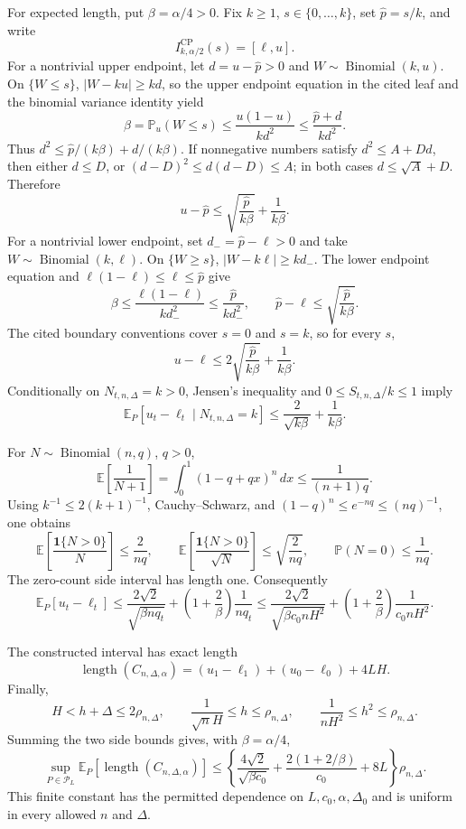 For expected length, put \(\beta=\alpha/4>0\).  Fix \(k\geq1\), \(s\in\{0,\ldots,k\}\), set \(\widehat p=s/k\), and write
\[
 I^{\mathrm{CP}}_{k,\alpha/2}(s)=[\ell,u].
\]
For a nontrivial upper endpoint, let \(d=u-\widehat p>0\) and \(W\sim\operatorname{Binomial}(k,u)\).  On \(\{W\leq s\}\), \(|W-ku|\geq kd\), so the upper endpoint equation in the cited leaf and the binomial variance identity yield
\[
 \beta=\mathbb P_u(W\leq s)
 \leq\frac{u(1-u)}{kd^2}
 \leq\frac{\widehat p+d}{kd^2}.
\]
Thus \(d^2\leq \widehat p/(k\beta)+d/(k\beta)\).  If nonnegative numbers satisfy \(d^2\leq A+Dd\), then either \(d\leq D\), or \((d-D)^2\leq d(d-D)\leq A\); in both cases \(d\leq\sqrt A+D\).  Therefore
\[
 u-\widehat p\leq\sqrt{\frac{\widehat p}{k\beta}}+\frac1{k\beta}.
\]
For a nontrivial lower endpoint, set \(d_-=\widehat p-\ell>0\) and take \(W\sim\operatorname{Binomial}(k,\ell)\).  On \(\{W\geq s\}\), \(|W-k\ell|\geq kd_-\).  The lower endpoint equation and \(\ell(1-\ell)\leq\ell\leq\widehat p\) give
\[
 \beta\leq\frac{\ell(1-\ell)}{kd_-^2}
 \leq\frac{\widehat p}{kd_-^2},
 \qquad
 \widehat p-\ell\leq\sqrt{\frac{\widehat p}{k\beta}}.
\]
The cited boundary conventions cover \(s=0\) and \(s=k\), so for every \(s\),
\[
 u-\ell\leq2\sqrt{\frac{\widehat p}{k\beta}}+\frac1{k\beta}.
\]
Conditionally on \(N_{t,n,\Delta}=k>0\), Jensen's inequality and \(0\leq S_{t,n,\Delta}/k\leq1\) imply
\[
 \mathbb E_P[u_t-\ell_t\mid N_{t,n,\Delta}=k]
 \leq\frac2{\sqrt{k\beta}}+\frac1{k\beta}.
\]

For \(N\sim\operatorname{Binomial}(n,q)\), \(q>0\),
\[
 \mathbb E\!\left[\frac1{N+1}\right]
 =\int_0^1(1-q+qx)^n\,dx
 \leq\frac1{(n+1)q}.
\]
Using \(k^{-1}\leq2(k+1)^{-1}\), Cauchy--Schwarz, and \((1-q)^n\leq e^{-nq}\leq(nq)^{-1}\), one obtains
\[
 \mathbb E\!\left[\frac{\mathbf1\{N>0\}}N\right]\leq\frac2{nq},
 \qquad
 \mathbb E\!\left[\frac{\mathbf1\{N>0\}}{\sqrt N}\right]\leq\sqrt{\frac2{nq}},
 \qquad
 \mathbb P(N=0)\leq\frac1{nq}.
\]
The zero-count side interval has length one.  Consequently
\[
 \mathbb E_P[u_t-\ell_t]
 \leq\frac{2\sqrt2}{\sqrt{\beta nq_t}}
 +\left(1+\frac2\beta\right)\frac1{nq_t}
 \leq\frac{2\sqrt2}{\sqrt{\beta c_0nH^2}}
 +\left(1+\frac2\beta\right)\frac1{c_0nH^2}.
\]

The constructed interval has exact length
\[
 \operatorname{length}(C_{n,\Delta,\alpha})
 =(u_1-\ell_1)+(u_0-\ell_0)+4LH.
\]
Finally,
\[
 H<h+\Delta\leq2\rho_{n,\Delta},
 \qquad
 \frac1{\sqrt nH}\leq h\leq\rho_{n,\Delta},
 \qquad
 \frac1{nH^2}\leq h^2\leq\rho_{n,\Delta}.
\]
Summing the two side bounds gives, with \(\beta=\alpha/4\),
\[
 \sup_{P\in\mathcal P_L}\mathbb E_P[\operatorname{length}(C_{n,\Delta,\alpha})]
 \leq
 \left\{
 \frac{4\sqrt2}{\sqrt{\beta c_0}}
 +\frac{2(1+2/\beta)}{c_0}+8L
 \right\}\rho_{n,\Delta}.
\]
This finite constant has the permitted dependence on \(L,c_0,\alpha,\Delta_0\) and is uniform in every allowed \(n\) and \(\Delta\).